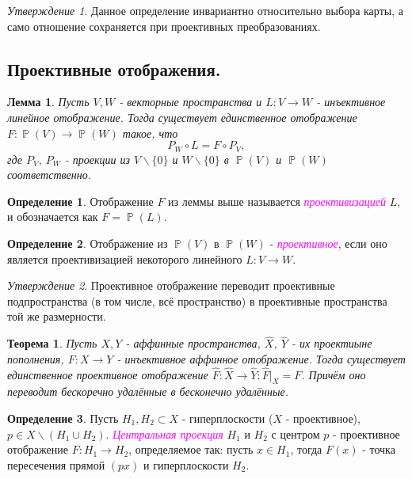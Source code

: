 \documentclass[a4paper,100pt]{article}
\theoremstyle{indented}
\newtheorem{theorem}{Теорема}
\newtheorem{lemma}{Лемма}
\theoremstyle{definition}
\newtheorem{defn}{Определение}
\theoremstyle{remark}
\newtheorem{stat}{Утверждение}
\DeclareMathOperator{\ra}{\rightarrow}
\DeclareMathOperator{\PP}{\mathbb{P}}
\begin{document}
\begin{stat}
    Данное определение инвариантно относительно выбора карты, а само отношение сохраняется при проективных преобразованиях.
\end{stat}

\subsection{Проективные отображения.}

\begin{lemma}
    Пусть $V, W$ - векторные пространства и $L:V\ra W$ - инъективное линейное отображение. Тогда существует единственное отображение $F:\PP(V) \ra \PP(W)$ такое, что 
    \[
        P_W\circ L = F \circ P_V, 
    \]
    где $P_V$, $P_W$ - проекции из $V \backslash \{0\}$ и $W \backslash \{0\}$ в $\PP(V)$ и $\PP(W)$ соответственно.
\end{lemma}

\begin{defn}
    Отображение $F$ из леммы выше называется \textit{\textcolor{magenta}{\hypertarget{s42}{проективизацией}}} $L$, и обозначается как $F=\PP(L)$. 
\end{defn}

\begin{defn}
    Отображение из $\PP(V)$ в $\PP(W)$ - \textit{\textcolor{magenta}{\hypertarget{s43}{проективное}}}, если оно является проективизацией некоторого линейного $L:V\ra W$. 
\end{defn}

\begin{stat}
    Проективное отображение переводит проективные подпространства (в том числе, всё пространство) в проективные пространства той же размерности.
\end{stat}

\begin{theorem}
    Пусть $X, Y$ - аффинные пространства, $\hat{X}$, $\hat{Y}$ - их проектиыне пополнения, $F: X\ra Y$ - инъективное аффинное отображение. Тогда существует единственное проективное отображение $\hat{F}: \hat{X} \ra \hat{Y}:\hat{F}|_X = F$. Причём оно переводит бескоречно удалённые в бесконечно удалённые.
\end{theorem}

\begin{defn}
    Пусть $H_1, H_2 \subset X$ - гиперплоскости ($X$ - проективное), $p \in X \backslash (H_1 \cup H_2)$. \textit{\textcolor{magenta}{\hypertarget{s44}{Центральная проекция}}} $H_1$ и $H_2$ с центром $p$ - проективное отображение $F:H_1 \ra H_2$, определяемое так: пусть $x\in H_1$, тогда $F(x)$ - точка пересечения прямой $(px)$ и гиперплоскости $H_2$.
\end{defn}
\end{document}
